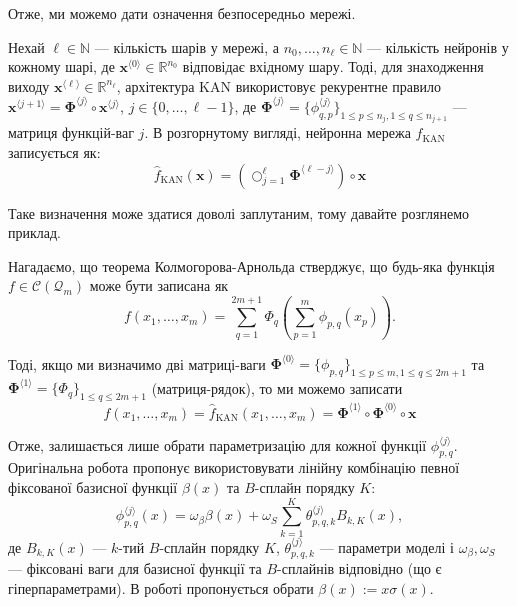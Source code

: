 Отже, ми можемо дати означення безпосередньо мережі.
\begin{definition}
	Нехай $\ell \in \mathbb{N}$ --- кількість шарів у мережі, а
	$n_0,\dots,n_{\ell} \in \mathbb{N}$ --- кількість нейронів у кожному шарі,
	де $\mathbf{x}^{\langle 0 \rangle} \in \mathbb{R}^{n_0}$ відповідає вхідному
	шару. Тоді, для знаходження виходу $\mathbf{x}^{\langle \ell \rangle} \in
	\mathbb{R}^{n_{\ell}}$, архітектура KAN використовує рекурентне правило
	$\mathbf{x}^{\langle j+1 \rangle} = \boldsymbol{\Phi}^{\langle j \rangle}
	\circ \mathbf{x}^{\langle j \rangle}$, $j \in \{0,\dots,\ell-1\}$, де
	$\boldsymbol{\Phi}^{\langle j \rangle} =
	\{\phi^{\langle j \rangle}_{q,p}\}_{1\leq p\leq n_j, 1 \leq q \leq
	n_{j+1}}$ --- матриця функцій-ваг $j$. В розгорнутому вигляді, нейронна мережа $\hat{f}_{\text{KAN}}$ записується як:
	\begin{equation*}
		\hat{f}_{\text{KAN}}(\mathbf{x}) = \left(\bigcirc_{j=1}^{\ell}\boldsymbol{\Phi}^{\langle \ell - j \rangle}\right)\circ \mathbf{x}
	\end{equation*}
\end{definition}

Таке визначення може здатися доволі заплутаним, тому давайте розглянемо приклад.

\begin{example}
	Нагадаємо, що теорема Колмогорова-Арнольда стверджує, що будь-яка функція 
	$f \in \mathcal{C}(\mathcal{Q}_m)$ може бути записана як
	\begin{equation*}
		f(x_1,\dots,x_m) = \sum_{q=1}^{2m+1}\Phi_q\left(\sum_{p=1}^m \phi_{p,q}(x_p)\right).
	\end{equation*}

	Тоді, якщо ми визначимо дві матриці-ваги $\boldsymbol{\Phi}^{\langle 0 \rangle} = \{\phi_{p,q}\}_{1 \leq p \leq m, 1 \leq q \leq 2m+1}$ та
	$\boldsymbol{\Phi}^{\langle 1 \rangle} = \{\Phi_q\}_{1 \leq q \leq 2m+1}$ (матриця-рядок), то ми можемо записати
	\begin{equation*}
		f(x_1,\dots,x_m) = \hat{f}_{\text{KAN}}(x_1,\dots,x_m) = \boldsymbol{\Phi}^{\langle 1 \rangle} \circ \boldsymbol{\Phi}^{\langle 0 \rangle} \circ \mathbf{x}
	\end{equation*}
\end{example}

Отже, залишається лише обрати параметризацію для кожної функції
$\phi_{p,q}^{\langle j \rangle}$. Оригінальна робота \cite{kan} пропонує 
використовувати лінійну комбінацію певної фіксованої базисної функції $\beta(x)$ та $B$-сплайн порядку $K$:
\begin{equation*}
	\phi_{p,q}^{\langle j \rangle}(x) = \omega_{\beta} \beta(x) + \omega_S\sum_{k=1}^{K} \theta_{p,q,k}^{\langle j \rangle} B_{k,K}(x),
\end{equation*}
де $B_{k,K}(x)$ --- $k$-тий $B$-сплайн порядку $K$, $\theta_{p,q,k}^{\langle j
\rangle}$ --- параметри моделі і $\omega_{\beta},\omega_S$ --- фіксовані ваги
для базисної функції та $B$-сплайнів відповідно (що є гіперпараметрами). В
роботі пропонується обрати $\beta(x) := x\sigma(x)$. 

